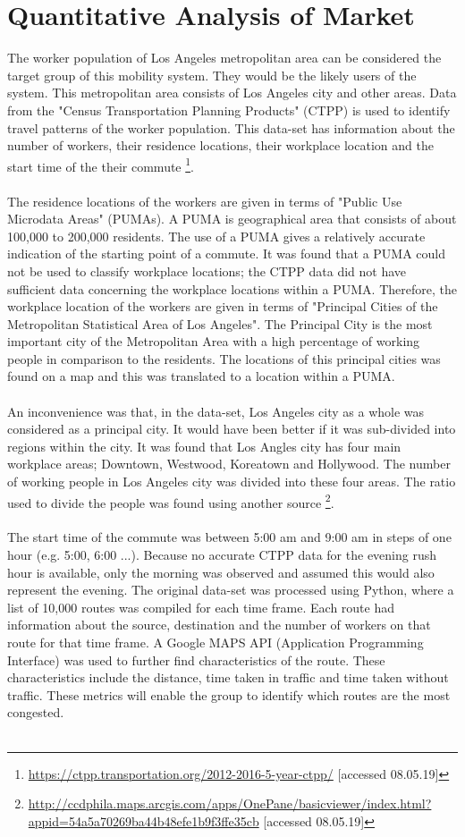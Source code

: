 \section{Quantitative Analysis of Market}
\label{quantmarket}
The worker population of Los Angeles metropolitan area can be considered the target group of this mobility system. They would be the likely users of the system. This metropolitan area consists of Los Angeles city and other areas.
Data from the "Census Transportation Planning Products" (CTPP) is used to identify travel patterns of the worker population. This data-set has information about the number of workers, their residence locations, their workplace location and the start time of the their commute \footnote{\url{https://ctpp.transportation.org/2012-2016-5-year-ctpp/} [accessed 08.05.19]}.\\\\
The residence locations of the workers are given in terms of "Public Use Microdata Areas" (PUMAs). A PUMA is geographical area that consists of about 100,000 to 200,000 residents. The use of a PUMA gives a relatively accurate indication of the starting point of a commute. It was found that a PUMA could not be used to classify workplace locations; the CTPP data did not have sufficient data concerning the workplace locations within a PUMA. Therefore, the workplace location of the workers are given in terms of "Principal Cities of the Metropolitan Statistical Area of Los Angeles". The Principal City is the most important city of the Metropolitan Area with a high percentage of working people in comparison to the residents. The locations of this principal cities was found on a map and this was translated to a location within a PUMA.\\\\
An inconvenience was that, in the data-set, Los Angeles city as a whole was considered as a principal city. It would have been better if it was sub-divided into regions within the city. It was found that Los Angles city has four main workplace areas; Downtown, Westwood, Koreatown and Hollywood. The number of working people in Los Angeles city was divided into these four areas. The ratio used to divide the people was found using another source \footnote{\url{http://ccdphila.maps.arcgis.com/apps/OnePane/basicviewer/index.html?appid=54a5a70269ba44b48efe1b9f3ffe35cb} [accessed 08.05.19]}. \\\\
The start time of the commute was between 5:00 am and 9:00 am in steps of one hour (e.g. 5:00, 6:00 ...). Because no accurate CTPP data for the evening rush hour is available, only the morning was observed and assumed this would also represent the evening. The original data-set was processed using Python, where a list of 10,000 routes was compiled for each time frame. Each route had information about the source, destination and the number of workers on that route for that time frame. A Google MAPS API (Application Programming Interface) was used to further find characteristics of the route. These characteristics include the distance, time taken in traffic and time taken without traffic. These metrics will enable the group to identify which routes are the most congested. \\\\
